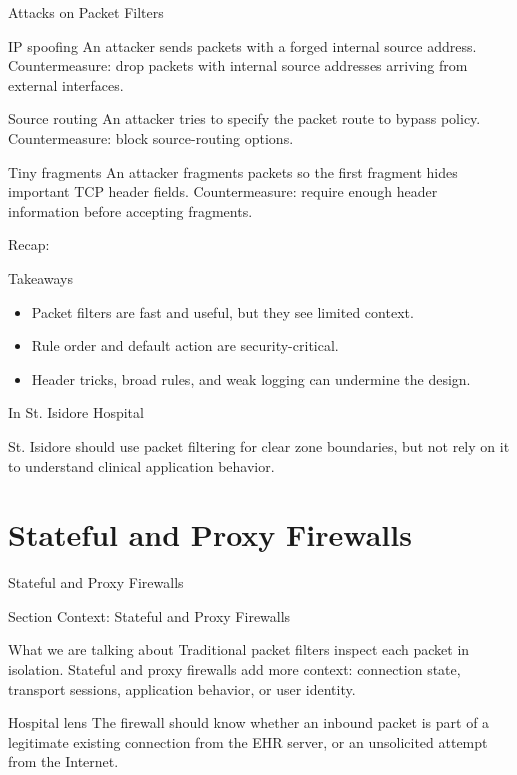 \documentclass[presentation]{beamer}
\newcommand{\sectiontitleframe}[1]{
\begin{frame}[plain,c]
\begin{center}
{\usebeamerfont{title}\usebeamercolor[fg]{title}#1}
\end{center}
\end{frame}
}
\newcommand{\scenario}{St. Isidore Hospital}
\newcommand{\takeawaysframe}[2]{
\begin{frame}[c]{Recap: \insertsection}
\begin{block}{Takeaways}
#1
\end{block}
\begin{exampleblock}{In \scenario}
#2
\end{exampleblock}
\end{frame}
}
\begin{document}
\begin{frame}[c]{Attacks on Packet Filters}
\begin{block}{IP spoofing}
An attacker sends packets with a forged internal source address. Countermeasure: drop packets with
internal source addresses arriving from external interfaces.
\end{block}

\begin{block}{Source routing}
An attacker tries to specify the packet route to bypass policy. Countermeasure: block source-routing
options.
\end{block}

\begin{block}{Tiny fragments}
An attacker fragments packets so the first fragment hides important TCP header fields. Countermeasure:
require enough header information before accepting fragments.
\end{block}
\end{frame}

\takeawaysframe{
\begin{itemize}
    \item Packet filters are fast and useful, but they see limited context.
    \item Rule order and default action are security-critical.
    \item Header tricks, broad rules, and weak logging can undermine the design.
\end{itemize}
}{
St. Isidore should use packet filtering for clear zone boundaries, but not rely on it to understand
clinical application behavior.
}

\section{Stateful and Proxy Firewalls}
\sectiontitleframe{Stateful and Proxy Firewalls}

\begin{frame}[c]{Section Context: Stateful and Proxy Firewalls}
\begin{block}{What we are talking about}
Traditional packet filters inspect each packet in isolation. Stateful and proxy firewalls add more
context: connection state, transport sessions, application behavior, or user identity.
\end{block}

\begin{exampleblock}{Hospital lens}
The firewall should know whether an inbound packet is part of a legitimate existing connection from
the EHR server, or an unsolicited attempt from the Internet.
\end{exampleblock}
\end{frame}
\end{document}
